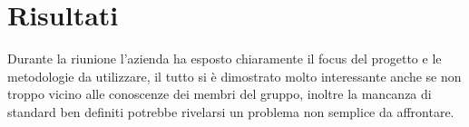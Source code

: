 \section{Risultati}
Durante la riunione l'azienda ha esposto chiaramente il focus del progetto e le metodologie da utilizzare, il tutto si è dimostrato molto interessante anche se non troppo vicino alle conoscenze dei membri del gruppo, inoltre la mancanza di standard ben definiti potrebbe rivelarsi un problema non semplice da affrontare.